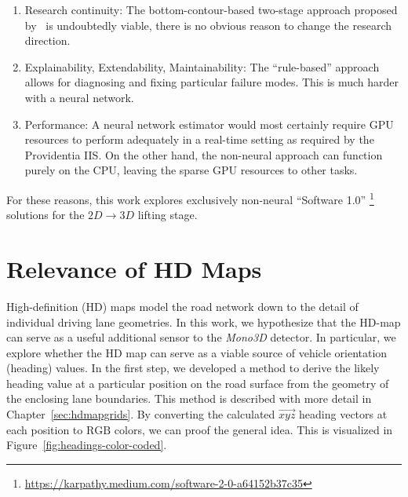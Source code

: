 \begin{enumerate}
    \item Research continuity: The bottom-contour-based two-stage approach proposed by~\cite{leonthesis} is undoubtedly viable, there is no obvious reason to change the research direction.
    \item Explainability, Extendability, Maintainability: The \enquote{rule-based} approach allows for diagnosing and fixing particular failure modes.
    This is much harder with a neural network.
    \item Performance: A neural network estimator would most certainly require GPU resources to perform adequately in a real-time setting as required by the Providentia IIS. On the other hand, the non-neural approach can function purely on the CPU, leaving the sparse GPU resources to other tasks.
\end{enumerate}

For these reasons, this work explores exclusively non-neural \enquote{Software 1.0} \footnote{\hyperlink{https://karpathy.medium.com/software-2-0-a64152b37c35}{https://karpathy.medium.com/software-2-0-a64152b37c35}} solutions for the $2D \rightarrow 3D$ lifting stage.

\section{Relevance of HD Maps}
\label{sec:hdmap}

High-definition (HD) maps model the road network down to the detail of individual driving lane geometries.
In this work, we hypothesize that the HD-map can serve as a useful additional sensor to the \textit{Mono3D} detector.
In particular, we explore whether the HD map can serve as a viable source of vehicle orientation (heading) values.
In the first step, we developed a method to derive the likely heading value at a particular position on the road surface from the geometry of the enclosing lane boundaries.
This method is described with more detail in Chapter~\ref{sec:hdmapgrids}.
By converting the calculated $\overrightarrow{xyz}$ heading vectors at each position to $\text{RGB}$ colors, we can proof the general idea.
This is visualized in Figure~\ref{fig:headings-color-coded}.

